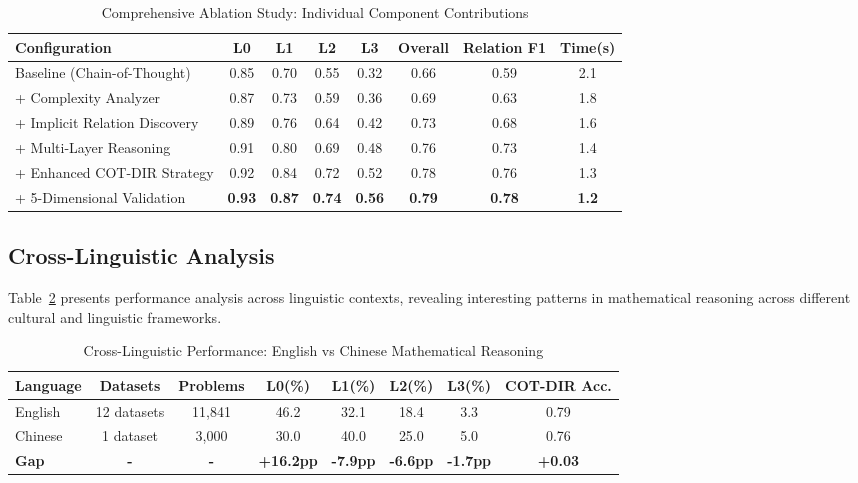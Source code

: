 \begin{table}[htbp]
\caption{Comprehensive Ablation Study: Individual Component Contributions}
\label{tab:detailed_ablation}
\centering
\small
\begin{tabular}{lccccccc}
\toprule
\textbf{Configuration} & \textbf{L0} & \textbf{L1} & \textbf{L2} & \textbf{L3} & \textbf{Overall} & \textbf{Relation F1} & \textbf{Time(s)} \\
\midrule
Baseline (Chain-of-Thought) & 0.85 & 0.70 & 0.55 & 0.32 & 0.66 & 0.59 & 2.1 \\
+ Complexity Analyzer & 0.87 & 0.73 & 0.59 & 0.36 & 0.69 & 0.63 & 1.8 \\
+ Implicit Relation Discovery & 0.89 & 0.76 & 0.64 & 0.42 & 0.73 & 0.68 & 1.6 \\
+ Multi-Layer Reasoning & 0.91 & 0.80 & 0.69 & 0.48 & 0.76 & 0.73 & 1.4 \\
+ Enhanced COT-DIR Strategy & 0.92 & 0.84 & 0.72 & 0.52 & 0.78 & 0.76 & 1.3 \\
+ 5-Dimensional Validation & \textbf{0.93} & \textbf{0.87} & \textbf{0.74} & \textbf{0.56} & \textbf{0.79} & \textbf{0.78} & \textbf{1.2} \\
\bottomrule
\end{tabular}
\end{table}

\subsection{Cross-Linguistic Analysis}

Table~\ref{tab:cross_linguistic} presents performance analysis across linguistic contexts, revealing interesting patterns in mathematical reasoning across different cultural and linguistic frameworks.

\begin{table}[htbp]
\caption{Cross-Linguistic Performance: English vs Chinese Mathematical Reasoning}
\label{tab:cross_linguistic}
\centering
\small
\begin{tabular}{lccccccc}
\toprule
\textbf{Language} & \textbf{Datasets} & \textbf{Problems} & \textbf{L0(\%)} & \textbf{L1(\%)} & \textbf{L2(\%)} & \textbf{L3(\%)} & \textbf{COT-DIR Acc.} \\
\midrule
English & 12 datasets & 11,841 & 46.2 & 32.1 & 18.4 & 3.3 & 0.79 \\
Chinese & 1 dataset & 3,000 & 30.0 & 40.0 & 25.0 & 5.0 & 0.76 \\
\midrule
\textbf{Gap} & \textbf{-} & \textbf{-} & \textbf{+16.2pp} & \textbf{-7.9pp} & \textbf{-6.6pp} & \textbf{-1.7pp} & \textbf{+0.03} \\
\bottomrule
\end{tabular}
\end{table}


